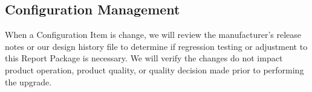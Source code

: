 \subsection{Configuration Management}
When a Configuration Item is change, we will review the manufacturer's release
notes or our design history file to determine if regression testing or
adjustment to this Report Package is necessary. We will verify the changes do
not impact product operation, product quality, or quality decision made prior
to performing the upgrade.
